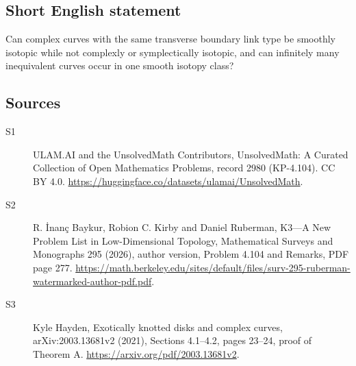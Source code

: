 \documentclass[11pt]{article}
\begin{document}
\subsection{Short English statement}
Can complex curves with the same transverse boundary link type be smoothly isotopic while not complexly or symplectically isotopic, and can infinitely many inequivalent curves occur in one smooth isotopy class?
\subsection{Sources}
\begin{description}
\item[\hypertarget{source:2980:1}{S1}] ULAM.AI and the UnsolvedMath Contributors, UnsolvedMath: A Curated Collection of Open Mathematics Problems, record 2980 (KP-4.104). CC BY 4.0. \url{https://huggingface.co/datasets/ulamai/UnsolvedMath}.
\item[\hypertarget{source:2980:2}{S2}] R. İnanç Baykur, Robion C. Kirby and Daniel Ruberman, K3—A New Problem List in Low-Dimensional Topology, Mathematical Surveys and Monographs 295 (2026), author version, Problem 4.104 and Remarks, PDF page 277. \url{https://math.berkeley.edu/sites/default/files/surv-295-ruberman-watermarked-author-pdf.pdf}.
\item[\hypertarget{source:2980:3}{S3}] Kyle Hayden, Exotically knotted disks and complex curves, arXiv:2003.13681v2 (2021), Sections 4.1--4.2, pages 23--24, proof of Theorem A. \url{https://arxiv.org/pdf/2003.13681v2}.
\end{description}
\label{end:2980}
\end{document}

